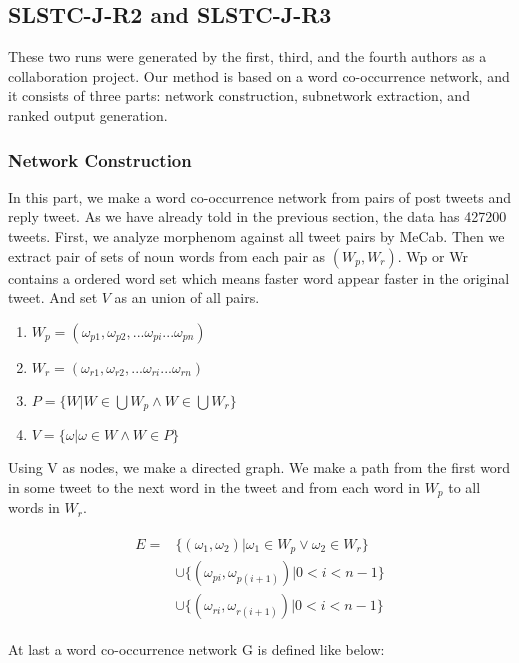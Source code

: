 \documentclass{../style/sig-alternate}
\begin{document}
\subsection{SLSTC-J-R2 and SLSTC-J-R3}
These two runs were generated by the first, third, and the fourth authors as a collaboration project.
Our method is based on a word co-occurrence network, and it consists of three parts:
network construction, subnetwork extraction, and ranked output generation.

\subsubsection{Network Construction}
In this part, we make a word co-occurrence network from pairs of post tweets and reply tweet.
As we have already told in the previous section, the data has 427200 tweets. 
First, we analyze morphenom against all tweet pairs by MeCab. Then we extract pair of sets of noun words from each pair as \((W_{p}, W_{r})\). Wp or Wr contains a ordered word set which means faster word appear faster in the original tweet. And set \(V\) as an union of all pairs.

\begin{enumerate}
    \item \(W_{p} = (\omega_{p1}, \omega_{p2}, ... \omega_{pi} ... \omega_{pn}) \)
    \item \(W_{r} = (\omega_{r1}, \omega_{r2}, ... \omega_{ri} ... \omega_{rn}) \)
    \item \(P = \{W | W \in \bigcup W_{p} \wedge W \in \bigcup W_{r}\}\)
    \item \(V = \{\omega | \omega \in W \wedge W \in P\} \)
\end{enumerate}

Using V as nodes, we make a directed graph. We make a path from the first word in some tweet to the next word in the tweet and from each word in \( W_{p} \) to all words in \(W_{r} \).

\begin{eqnarray}
\begin{split}
E = &\{(\omega_{1}, \omega_{2}) | \omega_{1}\in W_{p} \lor \omega_{2}\in W_{r}\}\\
&\cup \{(\omega_{pi}, \omega_{p(i+1)}) | 0 < i < n-1\}\\
&\cup \{(\omega_{ri}, \omega_{r(i+1)}) | 0 < i < n-1\}
\end{split}
\end{eqnarray}


At last a word co-occurrence network G is defined like below:
\end{document}

